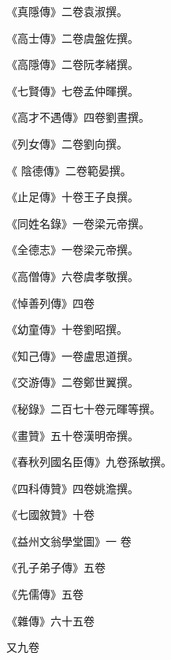 \begin{pinyinscope}
 《真隱傳》二卷袁淑撰。



 《高士傳》二卷虞盤佐撰。



 《高隱傳》二卷阮孝緒撰。



 《七賢傳》七卷孟仲暉撰。



 《高才不遇傳》四卷劉晝撰。



 《列女傳》二卷劉向撰。



 《
 陰德傳》二卷範晏撰。



 《止足傳》十卷王子良撰。



 《同姓名錄》一卷梁元帝撰。



 《全德志》一卷梁元帝撰。



 《高僧傳》六卷虞孝敬撰。



 《悼善列傳》四卷



 《幼童傳》十卷劉昭撰。



 《知己傳》一卷盧思道撰。



 《交游傳》二卷鄭世翼撰。



 《秘錄》二百七十卷元暉等撰。



 《畫贊》五十卷漢明帝撰。



 《春秋列國名臣傳》九卷孫敏撰。



 《四科傳贊》四卷姚澹撰。



 《七國敘贊》十卷



 《益州文翁學堂圖》一
 卷



 《孔子弟子傳》五卷



 《先儒傳》五卷



 《雜傳》六十五卷



 又九卷




\end{pinyinscope}
